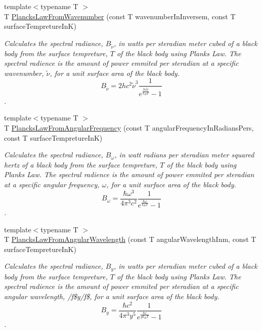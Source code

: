 \begin{DoxyCompactItemize}
{\footnotesize template$<$typename T $>$ }\\T \mbox{\hyperlink{group___e_g_x_phys-_electrodynamics-_black_body-_plancks_law_ga6648ae2a0fbff6735c1e1a04c7cac746}{Plancks\+Law\+From\+Wavenumber}} (const T wavenumber\+In\+Inversem, const T surface\+Tempreture\+InK)
\begin{DoxyCompactList}\small\item\em Calculates the spectral radiance, $B_{\tilde {\nu }}$, in watts per steradian meter cubed of a black body from the surface tempreture, $T$ of the black body using Plank\textquotesingle{}s Law. The spectral radience is the amount of power emmited per steradian at a specific wavenumber, $\tilde {\nu }$, for a unit surface area of the black body. \[ B_{\tilde {\nu }} = 2 h c^2 \tilde {\nu }^3 \dfrac{1}{e^{\frac{hc \tilde {\nu }}{k_B T}} - 1} \]. \end{DoxyCompactList}\item 
{\footnotesize template$<$typename T $>$ }\\T \mbox{\hyperlink{group___e_g_x_phys-_electrodynamics-_black_body-_plancks_law_gaac540560c71e30c02b91d22e417b5863}{Plancks\+Law\+From\+Angular\+Frequency}} (const T angular\+Frequency\+In\+Radians\+Pers, const T surface\+Tempreture\+InK)
\begin{DoxyCompactList}\small\item\em Calculates the spectral radiance, $B_{\omega}$, in watt radians per steradian meter squared hertz of a black body from the surface tempreture, $T$ of the black body using Plank\textquotesingle{}s Law. The spectral radience is the amount of power emmited per steradian at a specific angular frequency, $\omega$, for a unit surface area of the black body. \[ B_{\omega} = \dfrac{\hbar \omega^3}{4\pi^3c^2} \dfrac{1}{e^{\frac{\hbar\omega}{k_B T}} - 1} \]. \end{DoxyCompactList}\item 
{\footnotesize template$<$typename T $>$ }\\T \mbox{\hyperlink{group___e_g_x_phys-_electrodynamics-_black_body-_plancks_law_ga7322124727f968d28807e918c5eeb23f}{Plancks\+Law\+From\+Angular\+Wavelength}} (const T angular\+Wavelength\+Inm, const T surface\+Tempreture\+InK)
\begin{DoxyCompactList}\small\item\em Calculates the spectral radiance, $B_{y}$, in watts per steradian meter cubed of a black body from the surface tempreture, $T$ of the black body using Plank\textquotesingle{}s Law. The spectral radience is the amount of power emmited per steradian at a specific angular wavelength, /f\$y/f\$, for a unit surface area of the black body. \[ B_{y} = \dfrac{\hbar c^2}{4\pi^3y^5} \dfrac{1}{e^{\frac{\hbar c}{y k_B T}} - 1} \]. \end{DoxyCompactList}\item 

\end{DoxyCompactItemize}
